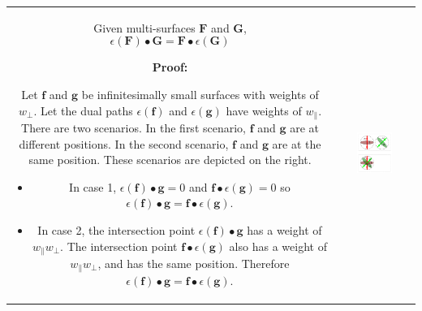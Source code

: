 \begin{tabular}{cc}
\parbox{0.5\textwidth}{
\begin{thm}\label{thm:path-surface_intersection_duality}
Given multi-surfaces \(\mathbf{F}\) and \(\mathbf{G}\), 
\[\epsilon(\mathbf{F}) \bullet \mathbf{G} = \mathbf{F} \bullet \epsilon(\mathbf{G})\]
\end{thm}
\textbf{Proof:}

Let \(\mathbf{f}\) and \(\mathbf{g}\) be infinitesimally small surfaces with weights of \(w_{\perp}\). Let the dual paths \(\epsilon(\mathbf{f})\) and \(\epsilon(\mathbf{g})\) have weights of \(w_{\parallel}\). There are two scenarios. In the first scenario, \(\mathbf{f}\) and \(\mathbf{g}\) are at different positions. In the second scenario, \(\mathbf{f}\) and \(\mathbf{g}\) are at the same position. These scenarios are depicted on the right.

\begin{itemize}
\item In case 1, \(\epsilon(\mathbf{f}) \bullet \mathbf{g} = 0\) and \(\mathbf{f} \bullet \epsilon(\mathbf{g}) = 0\) so \(\epsilon(\mathbf{f}) \bullet \mathbf{g} = \mathbf{f} \bullet \epsilon(\mathbf{g})\). 
\item In case 2, the intersection point \(\epsilon(\mathbf{f}) \bullet \mathbf{g}\) has a weight of \(w_{\parallel} w_{\perp}\). The intersection point \(\mathbf{f} \bullet \epsilon(\mathbf{g})\) also has a weight of \(w_{\parallel} w_{\perp}\), and has the same position. Therefore \(\epsilon(\mathbf{f}) \bullet \mathbf{g} = \mathbf{f} \bullet \epsilon(\mathbf{g})\).  
\end{itemize}
} & \parbox{0.5\textwidth}{
\includegraphics[width = 0.5\textwidth]{Duality/path_surface_duality_intersection}
}
\end{tabular}

